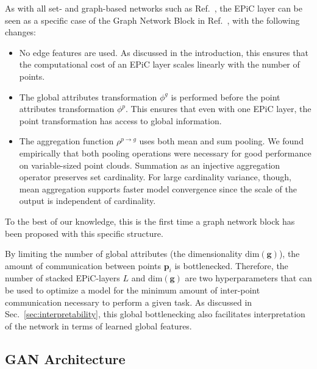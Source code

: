 \documentclass[a4paper,submission, Phys]{SciPost}
\DeclareRobustCommand{\Sec}[1]{Sec.~\ref{sec:#1}}
\DeclareRobustCommand{\Reff}[1]{Ref.~\cite{#1}}
\begin{document}
As with all set- and graph-based networks such as \Reff{DeepSets, MPNN, GarNet_2019}, the EPiC layer can be seen as a specific case of the Graph Network Block in \Reff{BattagliaGN}, with the following changes:
%
\begin{itemize}
%
\item No edge features are used.  As discussed in the introduction, this ensures that the computational cost of an EPiC layer scales linearly with the number of points.
%
\item The global attributes transformation $\phi^g$ is performed before the point attributes transformation $\phi^p$.  This ensures that even with one EPiC layer, the point transformation has access to global information.
%
\item The aggregation function $\rho^{p \rightarrow g}$ uses both mean and sum pooling.
%
We found empirically that both pooling operations were necessary for good performance on variable-sized point clouds. 
%
Summation as an injective aggregation operator preserves set cardinality.
%
For large cardinality variance, though, mean aggregation supports faster model convergence since the scale of the output is independent of cardinality.
%
\end{itemize}
%
To the best of our knowledge, this is the first time a graph network block has been proposed with this specific structure.





By limiting the number of global attributes (the dimensionality $\text{dim}(\boldsymbol{g})$), the amount of communication between points $\boldsymbol{p}_i$ is bottlenecked. 
%
Therefore, the number of stacked EPiC-layers $L$ and $\text{dim}(\boldsymbol{g})$ are two hyperparameters that can be used to optimize a model for the minimum amount of inter-point communication necessary to perform a given task.
%
As discussed in \Sec{interpretability}, this global bottlenecking also facilitates interpretation of the network in terms of learned global features.


\subsection{GAN Architecture}
\label{sec:epic-gan}
\end{document}
